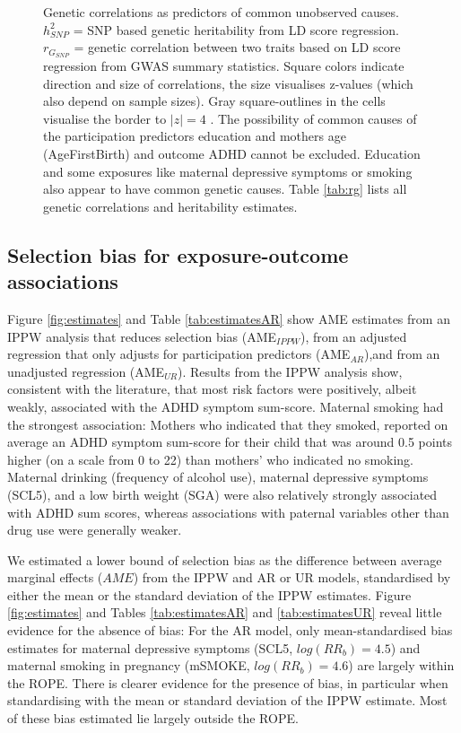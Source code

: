 \documentclass[12pt]{article}
\begin{document}
\begin{figure}
	\begin{center}
	\end{center}
	\caption{Genetic correlations as predictors of common unobserved causes. $h^2_{SNP}$ = SNP based genetic heritability from LD score regression. $r_{G_{SNP}}$ = genetic correlation between two traits based on LD score regression from GWAS summary statistics. Square colors indicate direction and size of correlations, the size visualises z-values (which also depend on sample sizes). Gray square-outlines in the cells visualise the border to $|z|=4$ . The possibility of common causes of the participation predictors education and mothers age (AgeFirstBirth) and outcome ADHD cannot be excluded. Education and some exposures like maternal depressive symptoms or smoking also appear to have common genetic causes. Table \ref{tab:rg} lists all genetic correlations and heritability estimates.}
	\label{fig:rg}
\end{figure}

\subsection*{Selection bias for exposure-outcome associations}
Figure \ref{fig:estimates} and Table \ref{tab:estimatesAR} show AME estimates from an IPPW analysis that reduces selection bias (AME$_{IPPW}$), from an adjusted regression that only adjusts for participation predictors (AME$_{AR}$),and from an unadjusted regression (AME$_{UR}$). Results from the IPPW analysis show, consistent with the literature, that most risk factors were positively, albeit weakly, associated with the ADHD symptom sum-score. Maternal smoking had the strongest association: Mothers who indicated that they smoked, reported on average an ADHD symptom sum-score for their child that was around 0.5 points higher (on a scale from 0 to 22) than mothers' who indicated no smoking. Maternal drinking (frequency of alcohol use), maternal depressive symptoms (SCL5), and a low birth weight (SGA) were also relatively strongly associated with ADHD sum scores, whereas associations with paternal variables other than drug use were generally weaker.

We estimated a lower bound of selection bias as the difference between average marginal effects ($AME$) from the IPPW and AR or UR models, standardised by either the mean or the standard deviation of the IPPW estimates. Figure \ref{fig:estimates} and Tables \ref{tab:estimatesAR} and \ref{tab:estimatesUR} reveal little evidence for the absence of bias: For the AR model, only mean-standardised bias estimates for maternal depressive symptoms (SCL5, $log(RR_b)=4.5$) and maternal smoking in pregnancy (mSMOKE, $log(RR_b)=4.6$) are largely within the ROPE. There is clearer evidence for the presence of bias, in particular when standardising with the mean or standard deviation of the IPPW estimate. Most of these bias estimated lie largely outside the ROPE. 
\end{document}
